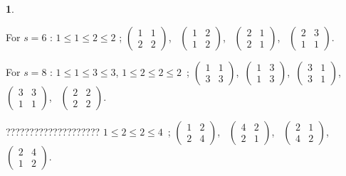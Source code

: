 \documentclass[a4paper,12pt]{article}
\theoremstyle{definition}
\theoremstyle{underlinethm}
\theoremstyle{definition}
\newtheorem{subsubsec}{}[subsection]
\begin{document}
\begin{subsubsec}
\begin{enumerate}[label=(\alph*)]
For $s=6$ : $1 \leq 1 \leq 2 \leq 2$  ; $\begin{pmatrix}1 & 1\\ 2 & 2\end{pmatrix}$,~ $\begin{pmatrix}1 & 2\\ 1 & 2\end{pmatrix}$,~ $\begin{pmatrix}2 & 1\\ 2 & 1\end{pmatrix}$,~ $\begin{pmatrix}2 & 3\\ 1 & 1\end{pmatrix}$.

{\fontsize{11}{14}\selectfont For $s=8$ : $1 \leq 1 \leq 3 \leq 3$, $1 \leq 2 \leq 2 \leq 2$~; $\begin{pmatrix}1 & 1\\ 3 & 3\end{pmatrix}$,~$\begin{pmatrix}1 & 3\\ 1 & 3\end{pmatrix}$,~$\begin{pmatrix}3 & 1\\ 3 & 1\end{pmatrix}$,~ $\begin{pmatrix}3 & 3\\ 1 & 1\end{pmatrix}$,~ $\begin{pmatrix}2 & 2\\ 2 & 2\end{pmatrix}$.} 
\end{enumerate}

????????????????????  $1 \leq 2 \leq 2 \leq 4$~; $\begin{pmatrix}1 & 2\\ 2 & 4\end{pmatrix}$,~ $\begin{pmatrix}4 & 2\\ 2 & 1\end{pmatrix}$,~ $\begin{pmatrix}2 & 1\\ 4 & 2\end{pmatrix}$,~ $\begin{pmatrix}2 & 4\\ 1 & 2\end{pmatrix}$.

\end{subsubsec}
\end{document}
